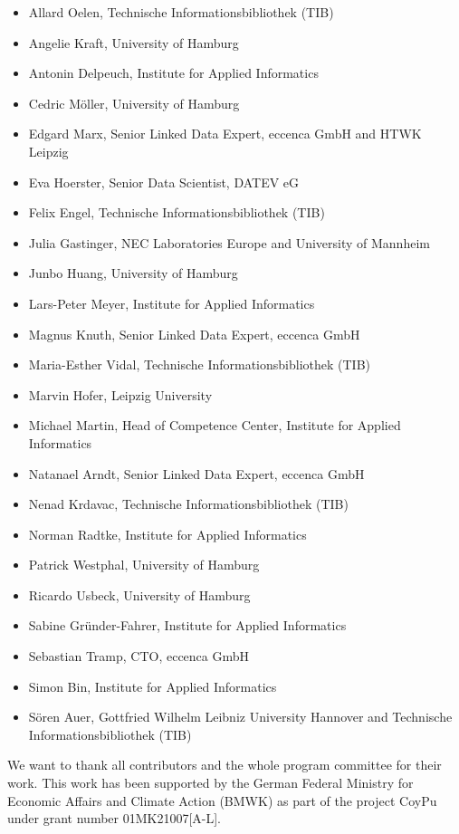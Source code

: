 \documentclass{ceurart}
\begin{document}

\begin{itemize}
    \item Allard Oelen, Technische Informationsbibliothek (TIB)
    \item Angelie Kraft, University of Hamburg
    \item Antonin Delpeuch, Institute for Applied Informatics
    \item Cedric Möller, University of Hamburg
    \item Edgard Marx, Senior Linked Data Expert, eccenca GmbH and HTWK Leipzig
    \item Eva Hoerster, Senior Data Scientist, DATEV eG
    \item Felix Engel, Technische Informationsbibliothek (TIB)
    \item Julia Gastinger, NEC Laboratories Europe and University of Mannheim
    \item Junbo Huang, University of Hamburg
    \item Lars-Peter Meyer,  Institute for Applied Informatics
    \item Magnus Knuth, Senior Linked Data Expert, eccenca GmbH
    \item Maria-Esther Vidal, Technische Informationsbibliothek (TIB)
    \item Marvin Hofer, Leipzig University
    \item Michael Martin, Head of Competence Center, Institute for Applied Informatics
    \item Natanael Arndt, Senior Linked Data Expert, eccenca GmbH
    \item Nenad Krdavac, Technische Informationsbibliothek (TIB)
    \item Norman Radtke, Institute for Applied Informatics
    \item Patrick Westphal, University of Hamburg
    \item Ricardo Usbeck, University of Hamburg
    \item Sabine Gründer-Fahrer, Institute for Applied Informatics
    \item Sebastian Tramp, CTO, eccenca GmbH
    \item Simon Bin, Institute for Applied Informatics
    \item Sören Auer, Gottfried Wilhelm Leibniz University Hannover and Technische Informationsbibliothek (TIB)
\end{itemize}


\begin{acknowledgments}
We want to thank all contributors and the whole program committee for their work.
This work has been supported by the German Federal Ministry for Economic Affairs and Climate Action (BMWK) as part of the project CoyPu under grant number 01MK21007[A-L].
\end{acknowledgments}




\end{document}
